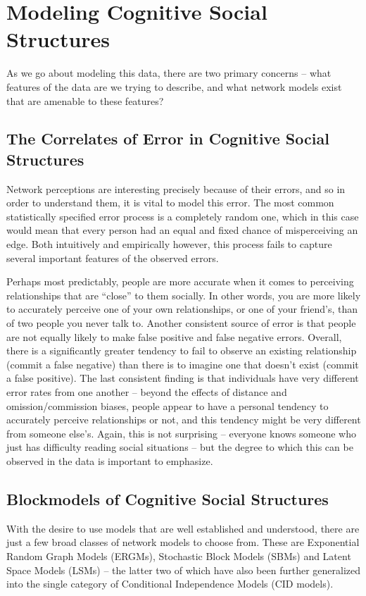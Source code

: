 \documentclass[11pt]{scrartcl}
\begin{document}
\section{Modeling Cognitive Social Structures}

As we go about modeling this data, there are two primary concerns -- what features of the data are we trying to describe, and what network models exist that are amenable to these features?

\subsection{The Correlates of Error in Cognitive Social Structures}
Network perceptions are interesting precisely because of their errors, and so in order to understand them, it is vital to model this error. The most common statistically specified error process is a completely random one, which in this case would mean that every person had an equal and fixed chance of misperceiving an edge. Both intuitively and empirically however, this process fails to capture several important features of the observed errors.

Perhaps most predictably, people are more accurate when it comes to perceiving relationships that are ``close'' to them socially. In other words, you are more likely to accurately perceive one of your own relationships, or one of your friend's, than of two people you never talk to. Another consistent source of error is that people are not equally likely to make false positive and false negative errors. Overall, there is a significantly greater tendency to fail to observe an existing relationship (commit a false negative) than there is to imagine one that doesn't exist (commit a false positive). The last consistent finding is that individuals have very different error rates from one another -- beyond the effects of distance and omission/commission biases, people appear to have a personal tendency to accurately perceive relationships or not, and this tendency might be very different from someone else's. Again, this is not surprising -- everyone knows someone who just has difficulty reading social situations -- but the degree to which this can be observed in the data is important to emphasize.

\subsection{Blockmodels of Cognitive Social Structures}
With the desire to use models that are well established and understood, there are just a few broad classes of network models to choose from. These are Exponential Random Graph Models (ERGMs), Stochastic Block Models (SBMs) and Latent Space Models (LSMs) -- the latter two of which have also been further generalized into the single category of Conditional Independence Models (CID models). 
\end{document}

